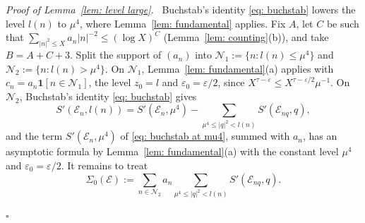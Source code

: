 \documentclass{article}
\numberwithin{equation}{section}
\newenvironment{proof}[1][Proof]{\par\medskip\noindent\textit{#1.}\ }{\hfill$\square$\par\medskip}
\newcommand{\Le}{\leqslant}
\begin{document}
\begin{proof}[Proof of Lemma~\ref{lem: level large}]
Buchstab's identity \eqref{eq: buchstab} lowers the level $l(n)$ to $\mu^4$, where Lemma~\ref{lem: fundamental} applies. Fix $A$, let $C$ be such that $\sum_{|n|^2 \Le X} a_n |n|^{-2} \Le (\log X)^C$ (Lemma~\ref{lem: counting}(b)), and take $B = A + C + 3$. Split the support of $(a_n)$ into $\mathcal{N}_1 := \{n : l(n) \Le \mu^4\}$ and $\mathcal{N}_2 := \{n : l(n) > \mu^4\}$. On $\mathcal{N}_1$, Lemma~\ref{lem: fundamental}(a) applies with $c_n = a_n \mathbf{1}[n \in \mathcal{N}_1]$, the level $z_0 = l$ and $\varepsilon_0 = \varepsilon/2$, since $X^{\tau - \varepsilon} \Le X^{\tau - \varepsilon/2} \mu^{-1}$. On $\mathcal{N}_2$, Buchstab's identity \eqref{eq: buchstab} gives
\begin{equation}
\label{eq: buchstab at mu4}
S'(\mathcal{E}_n, l(n)) = S'(\mathcal{E}_n, \mu^4) - \sum_{\mu^4 \Le |q|^2 < l(n)} S'(\mathcal{E}_{nq}, q),
\end{equation}
and the term $S'(\mathcal{E}_n, \mu^4)$ of \eqref{eq: buchstab at mu4}, summed with $a_n$, has an asymptotic formula by Lemma~\ref{lem: fundamental}(a) with the constant level $\mu^4$ and $\varepsilon_0 = \varepsilon/2$. It remains to treat
\begin{equation}
\label{eq: sigma zero}
\Sigma_0(\mathcal{E}) := \sum_{n \in \mathcal{N}_2} a_n \sum_{\mu^4 \Le |q|^2 < l(n)} S'(\mathcal{E}_{nq}, q).
\end{equation}


\end{proof}
\end{document}
